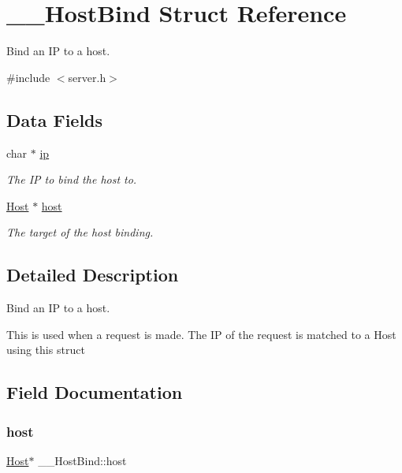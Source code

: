 \hypertarget{struct_____host_bind}{}\section{\+\_\+\+\_\+\+Host\+Bind Struct Reference}
\label{struct_____host_bind}


Bind an IP to a host.  




{\ttfamily \#include $<$server.\+h$>$}

\subsection*{Data Fields}
\begin{DoxyCompactItemize}
\item 
char $\ast$ \mbox{\hyperlink{struct_____host_bind_adb22dedfee930d080c8acea30d3393c6}{ip}}
\begin{DoxyCompactList}\small\item\em The IP to bind the host to. \end{DoxyCompactList}\item 
\mbox{\hyperlink{host_8h_a30ca67c0ed1f344be0c570271ecfc489}{Host}} $\ast$ \mbox{\hyperlink{struct_____host_bind_af6e9dd06a9acd289d27429f53b8bace6}{host}}
\begin{DoxyCompactList}\small\item\em The target of the host binding. \end{DoxyCompactList}\end{DoxyCompactItemize}


\subsection{Detailed Description}
Bind an IP to a host. 

This is used when a request is made. The IP of the request is matched to a Host using this struct 

\subsection{Field Documentation}
\mbox{\label{struct_____host_bind_af6e9dd06a9acd289d27429f53b8bace6}} 
\subsubsection{\texorpdfstring{host}{host}}
{\footnotesize\ttfamily \mbox{\hyperlink{host_8h_a30ca67c0ed1f344be0c570271ecfc489}{Host}}$\ast$ \+\_\+\+\_\+\+Host\+Bind\+::host}



